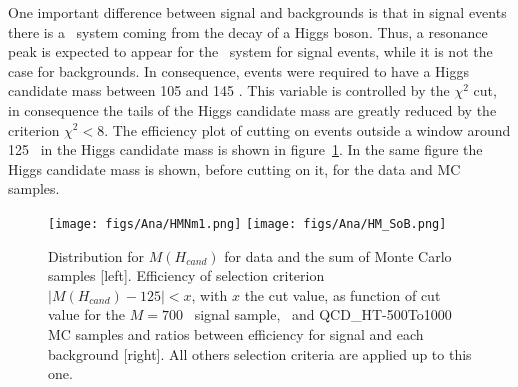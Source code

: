 %
%
One important difference between signal and backgrounds is that in signal events there is a \bbbar~system coming from the decay of a Higgs boson. Thus, a resonance peak is expected to appear for the \bbbar~system for signal events, while it is not the case for backgrounds. In consequence, events were required to have a Higgs candidate mass between 105 and 145 \GeVcc. This variable is controlled by the $\chi^{2}$ cut, in consequence the tails of the Higgs candidate mass are greatly reduced by the criterion $\chi^{2}<8$. The efficiency plot of cutting on events outside a window around 125 \GeVcc~in the Higgs candidate mass is shown in figure~\ref{fig:HiggsMassDMC}. In the same figure the Higgs candidate mass is shown, before cutting on it, for the data and MC samples.

\begin{figure}[!Hhtbp]
  \begin{center}
    \texttt{[image: figs/Ana/HMNm1.png]}
    \texttt{[image: figs/Ana/HM\_SoB.png]}
    \caption{Distribution for $M(H_{cand})$ for data and the sum of Monte Carlo samples [left]. Efficiency of selection criterion $|M(H_{cand})-125|<x$, with $x$ the cut value, as function of cut value for the $M=700$ \GeVcc~signal sample, \ttbar~and QCD\_HT-500To1000 MC samples and ratios between efficiency for signal and each background [right]. All others selection criteria are applied up to this one.}
    \label{fig:HiggsMassDMC}
  \end{center}
\end{figure}

